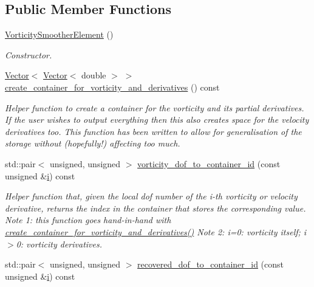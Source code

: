 \subsection*{Public Member Functions}
\begin{DoxyCompactItemize}
\item 
\hyperlink{classoomph_1_1VorticitySmootherElement_a96098a22de6fbae83a65cd4ee3d53675}{Vorticity\+Smoother\+Element} ()
\begin{DoxyCompactList}\small\item\em Constructor. \end{DoxyCompactList}\item 
\hyperlink{classoomph_1_1Vector}{Vector}$<$ \hyperlink{classoomph_1_1Vector}{Vector}$<$ double $>$ $>$ \hyperlink{classoomph_1_1VorticitySmootherElement_a84300b8d30090a7275a1e0233546b683}{create\+\_\+container\+\_\+for\+\_\+vorticity\+\_\+and\+\_\+derivatives} () const
\begin{DoxyCompactList}\small\item\em Helper function to create a container for the vorticity and its partial derivatives. If the user wishes to output everything then this also creates space for the velocity derivatives too. This function has been written to allow for generalisation of the storage without (hopefully!) affecting too much. \end{DoxyCompactList}\item 
std\+::pair$<$ unsigned, unsigned $>$ \hyperlink{classoomph_1_1VorticitySmootherElement_a9bc82b8c6788d3a4c35166a35a479cc0}{vorticity\+\_\+dof\+\_\+to\+\_\+container\+\_\+id} (const unsigned \&\hyperlink{cfortran_8h_adb50e893b86b3e55e751a42eab3cba82}{i}) const
\begin{DoxyCompactList}\small\item\em Helper function that, given the local dof number of the i-\/th vorticity or velocity derivative, returns the index in the container that stores the corresponding value. Note 1\+: this function goes hand-\/in-\/hand with \hyperlink{classoomph_1_1VorticitySmootherElement_a84300b8d30090a7275a1e0233546b683}{create\+\_\+container\+\_\+for\+\_\+vorticity\+\_\+and\+\_\+derivatives()} Note 2\+: i=0\+: vorticity itself; i$>$0\+: vorticity derivatives. \end{DoxyCompactList}\item 
std\+::pair$<$ unsigned, unsigned $>$ \hyperlink{classoomph_1_1VorticitySmootherElement_af5360f400ca274e7abfbb53b801241c6}{recovered\+\_\+dof\+\_\+to\+\_\+container\+\_\+id} (const unsigned \&\hyperlink{cfortran_8h_adb50e893b86b3e55e751a42eab3cba82}{i}) const

\end{DoxyCompactItemize}
